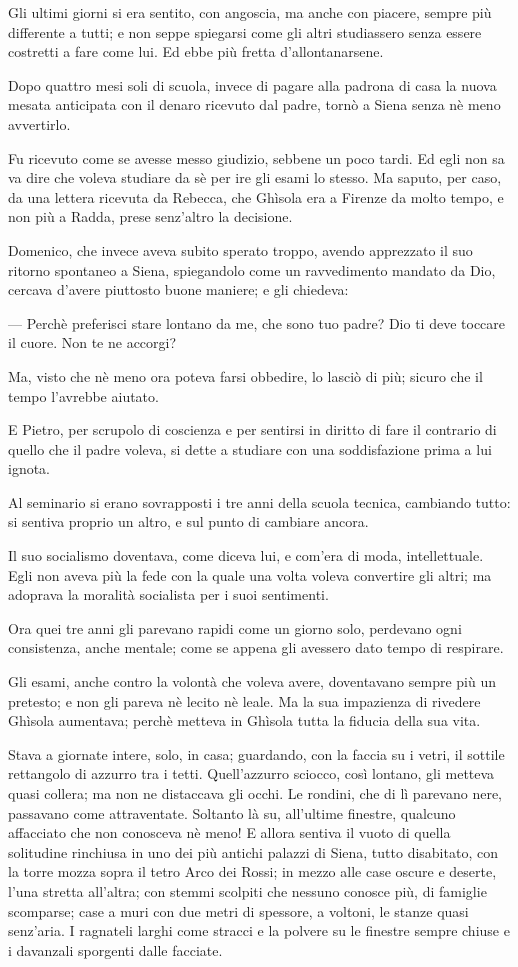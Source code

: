 Gli ultimi giorni si era sentito, con angoscia, ma anche con piacere, sempre più differente a tutti; e non seppe spiegarsi come gli altri studiassero senza essere costretti a fare come lui. Ed ebbe più fretta d’allontanarsene.

Dopo quattro mesi soli di scuola, invece di pagare alla padrona di casa la nuova mesata anticipata con il denaro ricevuto dal padre, tornò a Siena senza nè meno avvertirlo.

Fu ricevuto come se avesse messo giudizio, sebbene un poco tardi. Ed egli non sa va dire che voleva studiare da sè per ire gli esami lo stesso. Ma saputo, per caso, da una lettera ricevuta da Rebecca, che Ghìsola era a Firenze da molto tempo, e non più a Radda, prese senz’altro la decisione.

Domenico, che invece aveva subito sperato troppo, avendo apprezzato il suo ritorno spontaneo a Siena, spiegandolo come un ravvedimento mandato da Dio, cercava d’avere piuttosto buone maniere; e gli chiedeva:

— Perchè preferisci stare lontano da me, che sono tuo padre? Dio ti deve toccare il cuore. Non te ne accorgi?

Ma, visto che nè meno ora poteva farsi obbedire, lo lasciò di più; sicuro che il tempo l’avrebbe aiutato.

E Pietro, per scrupolo di coscienza e per sentirsi in diritto di fare il contrario di quello che il padre voleva, si dette a studiare con una soddisfazione prima a lui ignota.

Al seminario si erano sovrapposti i tre anni della scuola tecnica, cambiando tutto: si sentiva proprio un altro, e sul punto di cambiare ancora.

Il suo socialismo doventava, come diceva lui, e com’era di moda, intellettuale. Egli non aveva più la fede con la quale una volta voleva convertire gli altri; ma adoprava la moralità socialista per i suoi sentimenti.

Ora quei tre anni gli parevano rapidi come un giorno solo, perdevano ogni consistenza, anche mentale; come se appena gli avessero dato tempo di respirare.

Gli esami, anche contro la volontà che voleva avere, doventavano sempre più un pretesto; e non gli pareva nè lecito nè leale. Ma la sua impazienza di rivedere Ghìsola aumentava; perchè metteva in Ghìsola tutta la fiducia della sua vita.

Stava a giornate intere, solo, in casa; guardando, con la faccia su i vetri, il sottile rettangolo di azzurro tra i tetti. Quell'azzurro sciocco, così lontano, gli metteva quasi collera; ma non ne distaccava gli occhi. Le rondini, che di lì parevano nere, passavano come attraventate. Soltanto là su, all'ultime finestre, qualcuno affacciato che non conosceva nè meno! E allora sentiva il vuoto di quella solitudine rinchiusa in uno dei più antichi palazzi di Siena, tutto disabitato, con la torre mozza sopra il tetro Arco dei Rossi; in mezzo alle case oscure e deserte, l'una stretta all'altra; con stemmi scolpiti che nessuno conosce più, di famiglie scomparse; case a muri con due metri di spessore, a voltoni, le stanze quasi senz'aria. I ragnateli larghi come stracci e la polvere su le finestre sempre chiuse e i davanzali sporgenti dalle facciate.

